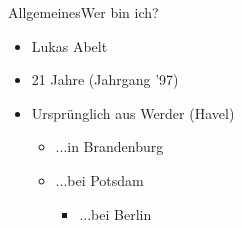 \begin{frame}{Allgemeines}{Wer bin ich?}
		\begin{itemize}
			\item Lukas Abelt
			\item <2-> 21 Jahre (Jahrgang '97)
			\item <3-> Ursprünglich aus Werder (Havel)
			\begin{itemize}
				\item <4->...in Brandenburg
				\item <5->...bei Potsdam
				\begin{itemize}
					\item <6->...bei Berlin
				\end{itemize}
			\end{itemize}
		\end{itemize}
	\end{frame}
	
